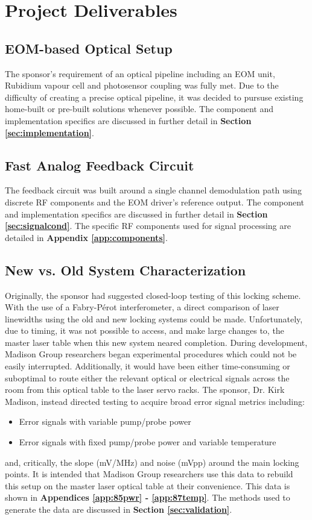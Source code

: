 \newpage
\section{Project Deliverables}

\subsection{EOM-based Optical Setup}

The sponsor's requirement of an optical pipeline including an EOM unit, Rubidium vapour cell and photosensor coupling was fully met. Due to the difficulty of creating a precise optical pipeline, it was decided to pursuse existing home-built or pre-built solutions whenever possible. The component and implementation specifics are discussed in further detail in \textbf{Section \ref{sec:implementation}}.

\subsection{Fast Analog Feedback Circuit}

The feedback circuit was built around a single channel demodulation path using discrete RF components and the EOM driver's reference output. The component and implementation specifics are discussed in further detail in \textbf{Section \ref{sec:signalcond}}. The specific RF components used for signal processing are detailed in \textbf{Appendix \ref{app:components}}.

\subsection{New vs. Old System Characterization}

Originally, the sponsor had suggested closed-loop testing of this locking scheme. With the use of a Fabry-P{\'e}rot interferometer, a direct comparison of laser linewidths using the old and new locking systems could be made. Unfortunately, due to timing, it was not possible to access, and make large changes to, the master laser table when this new system neared completion. During development, Madison Group researchers began experimental procedures which could not be easily interrupted. Additionally, it would have been either time-consuming or suboptimal to route either the relevant optical or electrical signals across the room from this optical table to the laser servo racks. The sponsor, Dr. Kirk Madison, instead directed testing to acquire broad error signal metrics including:
\begin{itemize}
    \item Error signals with variable pump/probe power
    \item Error signals with fixed pump/probe power and variable temperature
\end{itemize}
and, critically, the slope (mV/MHz) and noise (mVpp) around the main locking points. It is intended that Madison Group researchers use this data to rebuild this setup on the master laser optical table at their convenience. This data is shown in \textbf{Appendices \ref{app:85pwr} - \ref{app:87temp}}. The methods used to generate the data are discussed in \textbf{Section \ref{sec:validation}}.